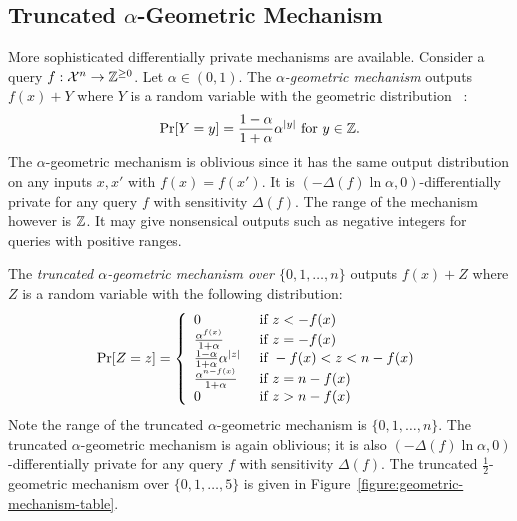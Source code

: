 \subsection{Truncated $\alpha$-Geometric Mechanism}\label{subsec:geometric}
More sophisticated differentially private mechanisms are
available. Consider a query
$f : \mathcal{X}^n \rightarrow \mathbb{Z}^{\geq 0}$. Let $\alpha \in (0, 1)$.
The \emph{$\alpha$-geometric mechanism}
outputs $f(x) + Y$ where $Y$ is a random variable with the geometric
distribution~\cite{GRS:09:UUPM,GRS:12:UUPM} :
\[
\Pr[Y = y] = \frac{1 - \alpha}{1 + \alpha}\alpha^{|y|}
\textmd{ for } y \in \mathbb{Z}.
\]
The $\alpha$-geometric mechanism is oblivious since it has the same
output distribution on any inputs $x, x'$ with $f (x) = f
(x')$. It is $(- {\Delta (f)} \ln \alpha, 0)$-differentially
private for any query $f$ with sensitivity $\Delta (f)$. The range of
the mechanism
however is $\mathbb{Z}$. It may give nonsensical outputs such as
negative integers for queries with positive ranges.

The \emph{truncated $\alpha$-geometric mechanism over $\{ 0, 1,
  \ldots, n \}$}
outputs $f (x) + Z$ where $Z$ is a random variable with the following
distribution:
\[
\Pr[Z = z] =
\left\{
  \begin{array}{ll}
    0 & \textmd{ if } z < - f (x) \\
    \frac{\alpha^{f (x)}}{1 + \alpha} & \textmd{ if } z = -f (x)\\
    \frac{1 - \alpha}{1 + \alpha}\alpha^{|z|} &
    \textmd{ if } -f (x) < z < n - f (x)\\
    \frac{\alpha^{n - f (x)}}{1 + \alpha} & \textmd{ if } z = n-f (x)\\
    0 & \textmd{ if } z > n - f (x)
  \end{array}
\right.
\]
Note the range of the truncated $\alpha$-geometric mechanism is
$\{ 0, 1, \ldots, n \}$. The truncated $\alpha$-geometric mechanism is
again oblivious; it is also $(- {\Delta (f)} \ln \alpha, 0)$-differentially
private for any query $f$ with sensitivity $\Delta (f)$.
The truncated $\frac{1}{2}$-geometric mechanism over $\{ 0, 1, \ldots, 5 \}$ is
given in Figure~\ref{figure:geometric-mechanism-table}.

